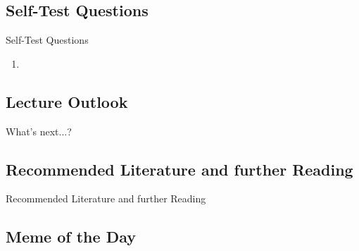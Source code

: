\subsection{Self-Test Questions}

\begin{frame}{Self-Test Questions}{}\important
	\begin{enumerate}
		\item
	\end{enumerate}
\end{frame}


\subsection{Lecture Outlook}

\begin{frame}{What's next...?}{}
\end{frame}


\subsection{Recommended Literature and further Reading}

\begin{frame}{Recommended Literature and further Reading}{}
	\footnotesize
	\begin{thebibliography}{2}
	
	\end{thebibliography}
\end{frame}


\subsection{Meme of the Day}

